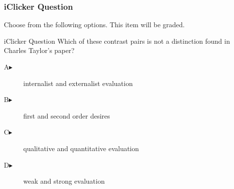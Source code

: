 \begin{frame}
  \frametitle{iClicker Question}
Choose from the following options. This item will be graded.
\begin{block}{iClicker Question}
Which of these contrast pairs is not a distinction found in Charles
Taylor's paper?
\end{block}
\begin{description}
\item[A\hspace{.2in}$\blacktriangleright$] internalist and externalist evaluation
\item[B\hspace{.2in}$\blacktriangleright$] first and second order desires
\item[C\hspace{.2in}$\blacktriangleright$] qualitative and quantitative evaluation
\item[D\hspace{.2in}$\blacktriangleright$] weak and strong evaluation
\end{description}
\end{frame}

